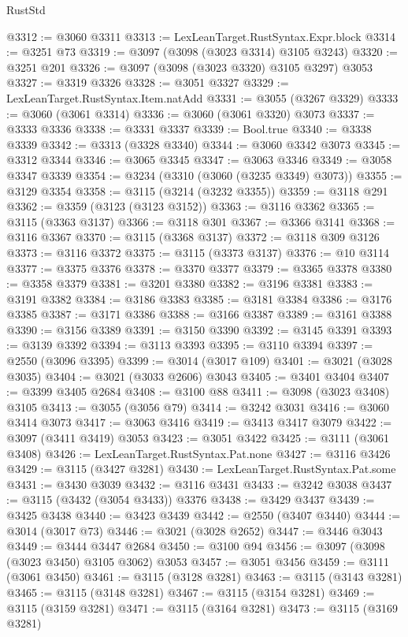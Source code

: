 \begin{lexlean}{RustStd}
\begin{coremodule}
{\begin{coremodule}
{{{{{{{{{{{{{{{{{{{{{{{{{{{{{{{{@3312 := @3060 @3311
@3313 := LexLeanTarget.RustSyntax.Expr.block
@3314 := @3251 @73
@3319 := @3097 (@3098 (@3023 @3314) @3105 @3243)
@3320 := @3251 @201
@3326 := @3097 (@3098 (@3023 @3320) @3105 @3297) @3053
@3327 := @3319 @3326
@3328 := @3051 @3327
@3329 := LexLeanTarget.RustSyntax.Item.natAdd
@3331 := @3055 (@3267 @3329)
@3333 := @3060 (@3061 @3314)
@3336 := @3060 (@3061 @3320) @3073
@3337 := @3333 @3336
@3338 := @3331 @3337
@3339 := Bool.true
@3340 := @3338 @3339
@3342 := @3313 (@3328 @3340)
@3344 := @3060 @3342 @3073
@3345 := @3312 @3344
@3346 := @3065 @3345
@3347 := @3063 @3346
@3349 := @3058 @3347 @3339
@3354 := @3234 (@3310 (@3060 (@3235 @3349) @3073))
@3355 := @3129 @3354
@3358 := @3115 (@3214 (@3232 @3355))
@3359 := @3118 @291
@3362 := @3359 (@3123 (@3123 @3152))
@3363 := @3116 @3362
@3365 := @3115 (@3363 @3137)
@3366 := @3118 @301
@3367 := @3366 @3141
@3368 := @3116 @3367
@3370 := @3115 (@3368 @3137)
@3372 := @3118 @309 @3126
@3373 := @3116 @3372
@3375 := @3115 (@3373 @3137)
@3376 := @10 @3114
@3377 := @3375 @3376
@3378 := @3370 @3377
@3379 := @3365 @3378
@3380 := @3358 @3379
@3381 := @3201 @3380
@3382 := @3196 @3381
@3383 := @3191 @3382
@3384 := @3186 @3383
@3385 := @3181 @3384
@3386 := @3176 @3385
@3387 := @3171 @3386
@3388 := @3166 @3387
@3389 := @3161 @3388
@3390 := @3156 @3389
@3391 := @3150 @3390
@3392 := @3145 @3391
@3393 := @3139 @3392
@3394 := @3113 @3393
@3395 := @3110 @3394
@3397 := @2550 (@3096 @3395)
@3399 := @3014 (@3017 @109)
@3401 := @3021 (@3028 @3035)
@3404 := @3021 (@3033 @2606) @3043
@3405 := @3401 @3404
@3407 := @3399 @3405 @2684
@3408 := @3100 @88
@3411 := @3098 (@3023 @3408) @3105
@3413 := @3055 (@3056 @79)
@3414 := @3242 @3031
@3416 := @3060 @3414 @3073
@3417 := @3063 @3416
@3419 := @3413 @3417 @3079
@3422 := @3097 (@3411 @3419) @3053
@3423 := @3051 @3422
@3425 := @3111 (@3061 @3408)
@3426 := LexLeanTarget.RustSyntax.Pat.none
@3427 := @3116 @3426
@3429 := @3115 (@3427 @3281)
@3430 := LexLeanTarget.RustSyntax.Pat.some
@3431 := @3430 @3039
@3432 := @3116 @3431
@3433 := @3242 @3038
@3437 := @3115 (@3432 (@3054 @3433)) @3376
@3438 := @3429 @3437
@3439 := @3425 @3438
@3440 := @3423 @3439
@3442 := @2550 (@3407 @3440)
@3444 := @3014 (@3017 @73)
@3446 := @3021 (@3028 @2652)
@3447 := @3446 @3043
@3449 := @3444 @3447 @2684
@3450 := @3100 @94
@3456 := @3097 (@3098 (@3023 @3450) @3105 @3062) @3053
@3457 := @3051 @3456
@3459 := @3111 (@3061 @3450)
@3461 := @3115 (@3128 @3281)
@3463 := @3115 (@3143 @3281)
@3465 := @3115 (@3148 @3281)
@3467 := @3115 (@3154 @3281)
@3469 := @3115 (@3159 @3281)
@3471 := @3115 (@3164 @3281)
@3473 := @3115 (@3169 @3281)
}}}}}}}}}}}}}}}}}}}}}}}}}}}}}}}}
\end{coremodule}}
\end{coremodule}
\end{lexlean}
